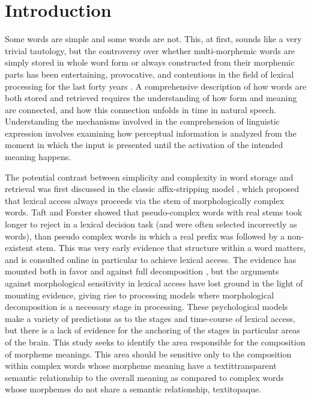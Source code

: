 \documentclass{frontiersSCNS}
\begin{document}
\section{Introduction}

	Some words are simple and some words are not. This, at first, sounds like a very trivial tautology, but the controversy over whether multi-morphemic words are simply stored in whole word form \citep*{Butterworth:1983, Giraudo:2001} or always constructed from their morphemic parts has been entertaining, provocative, and contentious in the field of lexical processing for the last forty years \citep*{Rastle:2003}. A comprehensive description of how words are both stored and retrieved requires the understanding of how form and meaning are connected, and how this connection unfolds in time in natural speech. Understanding the mechanisms involved in the comprehension of linguistic expression involves examining how perceptual information is analyzed from the moment in which the input is presented until the activation of the intended meaning happens.

	The potential contrast between simplicity and complexity in word storage and retrieval was first discussed in the classic affix-stripping model \citep*{Taft:1975}, which proposed that lexical access always proceeds via the stem of morphologically complex words.  Taft and Forster showed that pseudo-complex words with real stems took longer to reject in a lexical decision task (and were often selected incorrectly as words), than pseudo complex words in which a real prefix was followed by a non-existent stem. This was very early evidence that structure within a word matters, and is consulted online in particular to achieve lexical access. The evidence has mounted both in favor \citep*{Taft:2004, Marslen-Wilson:1994, Rastle:2004} and against full decomposition \citep*{Butterworth:1983, Giraudo:2001}, but the arguments against morphological sensitivity in lexical access have lost ground in the light of mounting evidence, giving rise to processing models where morphological decomposition is a necessary stage in processing. These psychological models make a variety of predictions as to the stages and time-course of lexical access, but there is a lack of evidence for the anchoring of the stages in particular areas of the brain. This study seeks to identify the area responsible for the composition of morpheme meanings. This area should be sensitive only to the composition within complex words whose morpheme meaning have a textit{transparent} semantic relationship to the overall meaning as compared to complex words whose morphemes do not share a semantic relationship, textit{opaque}.
\end{document}
